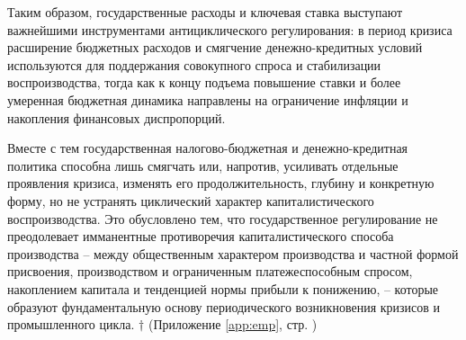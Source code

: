 Таким образом, государственные расходы и ключевая ставка выступают важнейшими инструментами антициклического регулирования: в период кризиса расширение бюджетных расходов и смягчение денежно-кредитных условий используются для поддержания совокупного спроса и стабилизации воспроизводства, тогда как к концу подъема повышение ставки и более умеренная бюджетная динамика направлены на ограничение инфляции и накопления финансовых диспропорций.

Вместе с тем государственная налогово-бюджетная и денежно-кредитная политика способна лишь смягчать или, напротив, усиливать отдельные проявления кризиса, изменять его продолжительность, глубину и конкретную форму, но не устранять циклический характер капиталистического воспроизводства. Это обусловлено тем, что государственное регулирование не преодолевает имманентные противоречия капиталистического способа производства – между общественным характером производства и частной формой присвоения, производством и ограниченным платежеспособным спросом, накоплением капитала и тенденцией нормы прибыли к понижению, – которые образуют фундаментальную основу периодического возникновения кризисов и промышленного цикла. $\dagger$ (Приложение \ref{app:emp}, стр. \pageref{fig:gov-consumption-key-rate})